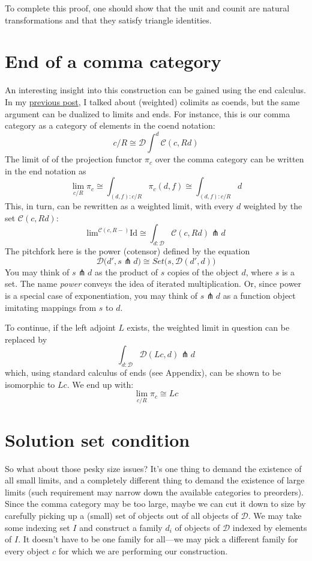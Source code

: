 \documentclass[11pt]{amsart}
\begin{document}
To complete this proof, one should show that the unit and counit are natural transformations and that they satisfy triangle identities. 

\section{End of a comma category}

An interesting insight into this construction can be gained using the end calculus. In my \href{http://bartoszmilewski.com/2020/07/20/weighted-colimits/}{previous post}, I talked about (weighted) colimits as coends, but the same argument can be dualized to limits and ends. For instance, this is our comma category as a category of elements in the coend notation:
\[c/R \cong \mathcal{D} \int^d \mathcal{C} (c, R d)\]
The limit of of the projection functor $\pi_c$ over the comma category can be written in the end notation as
\[\lim_{c/R} \pi_c \cong \int_{(d, f)\colon c/R} \pi_c (d, f) \cong \int_{(d, f)\colon c/R} d\]
This, in turn, can be rewritten as a weighted limit, with every $d$ weighted by the set $\mathcal{C}(c, R d)$:
\[\mbox{lim}^{\mathcal{C}(c, R -)} \mbox{Id} \cong \int_{d \colon \mathcal{D}} \mathcal{C}(c, R d) \pitchfork d\]
The pitchfork here is the power (cotensor) defined by the equation
\[\mathcal{D}\big(d', s \pitchfork d\big) \cong Set\big(s, \mathcal{D}(d', d)\big)\]
You may think of $s \pitchfork d$ as the product of $s$ copies of the object $d$, where $s$ is a set. The name \emph{power} conveys the idea of iterated multiplication. Or, since power is a special case of exponentiation, you may think of $s \pitchfork d$ as a function object imitating mappings from $s$ to $d$.

To continue, if the left adjoint $L$ exists, the weighted limit in question can be replaced by
\[\int_{d \colon \mathcal{D}} \mathcal{D}(L c, d) \pitchfork d\]
which, using standard calculus of ends (see Appendix), can be shown to be isomorphic to $L c$. We end up with:
\[\lim_{c/R} \pi_c \cong L c\]

\section{Solution set condition}

So what about those pesky size issues? It's one thing to demand the existence of all small limits, and a completely different thing to demand the existence of large limits (such requirement may narrow down the available categories to preorders). Since the comma category may be too large, maybe we can cut it down to size by carefully picking up a (small) set of objects out of all objects of $\mathcal D$. We may take some indexing set $I$ and construct a family $d_i$ of objects of $\mathcal D$ indexed by elements of $I$. It doesn't have to be one family for all---we may pick a different family for every object $c$ for which we are performing our construction. 
\end{document}
